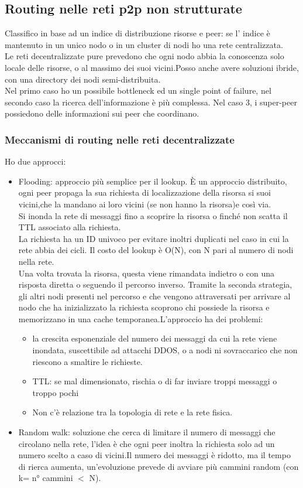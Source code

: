 \documentclass{article}
\begin{document}
\subsection{Routing nelle reti p2p non strutturate}
Classifico in base ad un indice di distribuzione risorse e peer: se l' indice è mantenuto in un unico nodo o in un cluster di nodi ho una rete centralizzata.\\ Le reti decentralizzate pure prevedono che ogni nodo abbia la conoscenza solo locale delle risorse, o al massimo dei suoi vicini.Posso anche avere soluzioni ibride, con una directory dei nodi semi-distribuita.\\Nel primo caso ho un possibile bottleneck ed un single point of failure, nel secondo caso la ricerca dell'informazione è più complessa. Nel caso 3, i super-peer possiedono delle informazioni sui peer che coordinano.
\subsubsection{Meccanismi di routing nelle reti decentralizzate}
Ho due approcci:
\begin{itemize}
\item Flooding: approccio più semplice per il lookup. È un approccio distribuito, ogni peer propaga la sua richiesta di localizzazione della risorsa si suoi vicini,che la mandano ai loro vicini (se non hanno la risorsa)e così via.\\ Si inonda la rete di messaggi fino a scoprire la risorsa o finché non scatta il TTL associato alla richiesta.\\ La richiesta ha un ID univoco per evitare inoltri duplicati nel caso in cui la rete abbia dei cicli. Il costo del lookup è O(N), con N pari al numero di nodi nella rete.\\ Una volta trovata la risorsa, questa viene rimandata indietro o con una risposta diretta o seguendo il percorso inverso. Tramite la seconda strategia, gli altri nodi presenti nel percorso e che vengono attraversati per arrivare al nodo che ha inizializzato la richiesta scoprono chi possiede la risorsa e memorizzano in una cache temporanea.L'approccio ha dei problemi:
\begin{itemize}
\item la crescita esponenziale del numero dei messaggi da cui la rete viene inondata, suscettibile ad attacchi DDOS, o a nodi ni sovraccarico che non riescono a smaltire le richieste.
\item TTL: se mal dimensionato, rischia o di far inviare troppi messaggi o troppo pochi
\item Non c'è relazione tra la topologia di rete e la rete fisica.
\end{itemize}
\item Random walk: soluzione che cerca di limitare il numero di messaggi che circolano nella rete, l'idea è che ogni peer inoltra la richiesta solo ad un numero scelto a caso di vicini.Il numero dei messaggi è ridotto, ma il tempo di rierca aumenta, un'evoluzione prevede di avviare più cammini random (con k= n° cammini $<$ N).
\end{itemize}
\end{document}
